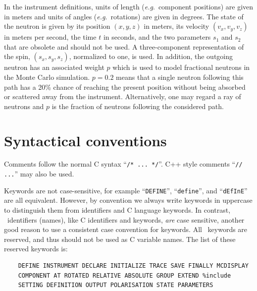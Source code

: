 In the instrument definitions, units of length (\textit{e.g}.\ component
positions) are given in meters and units of angles (\textit{e.g}.\ 
rotations) are given in degrees.  The state of the neutron is given by
its position $(x,y,z)$ in meters, its velocity $(v_x, v_y, v_z)$ in
meters per second, the time $t$ in seconds, and the two parameters
$s_1$ and $s_2$ that are obsolete and should not be used. A three-component
representation of the spin, $\left( s_x, s_y, s_z \right)$, normalized to
one, is used. In addition, the outgoing neutron has an associated weight $p$
which is used to model fractional neutrons in the Monte Carlo simulation.
$p=0.2$ means that a single neutron following this path has a 20\% chance of
reaching the present position without being absorbed or scattered away from
the instrument. Alternatively, one may regard a ray of neutrons and $p$ is
the fraction of neutrons following the considered path.

\section{Syntactical conventions}
\label{s:syntax}

Comments follow the normal C syntax ``\verb+/* ... */+''. C++ style
comments ``\verb+// ...+'' may also be used.


Keywords are not case-sensitive, for example ``\verb+DEFINE+'',
``\verb+define+'', and ``\verb+dEfInE+'' are all equivalent. However, by
convention we always write keywords in uppercase to distinguish them
from identifiers and C language keywords. In contrast, \MCS\ 
identifiers (names), like C identifiers and keywords, \emph{are} case
sensitive, another good reason to use a consistent case convention for
keywords. All \MCS\ keywords are reserved, and thus should not be used 
as C variable names. The list of these reserved keywords is:
\begin{verbatim}
    DEFINE INSTRUMENT DECLARE INITIALIZE TRACE SAVE FINALLY MCDISPLAY
    COMPONENT AT ROTATED RELATIVE ABSOLUTE GROUP EXTEND %include
    SETTING DEFINITION OUTPUT POLARISATION STATE PARAMETERS
\end{verbatim}

